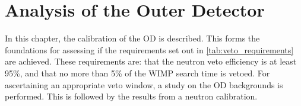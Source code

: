 \chapter{Analysis of the Outer Detector} \label{chap:analysis_of_the_od}

\par
In this chapter, the calibration of the OD is described.
This forms the foundations for assessing if the requirements set out in \autoref{tab:veto_requirements} are achieved.
These requirements are: that the neutron veto efficiency is at least 95\%, and that no more than 5\% of the WIMP search time is vetoed.
For ascertaining an appropriate veto window, a study on the OD backgrounds is performed. 
This is followed by the results from a neutron calibration.



\clearpage

\clearpage


%